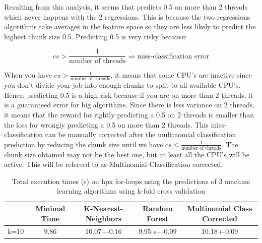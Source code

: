 Resulting from this analysis, it seems that predicts 0.5 on more than 2 threads which never happens with the 2 regressions. This is because the two regressions algorithms take averages in the feature space so they are less likely to predict the highest chunk size 0.5. Predicting 0.5 is very risky because:

$$cs>\frac{1}{\text{number of threads}} \Rightarrow \text{miss-classification error}$$

 When you have $cs>\frac{1}{\text{number of threads}}$, it means that some CPU's are inactive since you don't divide your job into enough chunks to split to all available CPU's. Hence, predicting 0.5 is a high risk because if you are on more than 2 threads, it is a guaranteed error for big algorithms. Since there is less variance on 2 threads, it means that the reward for rightly predicting a  0.5 on 2 threads is smaller than the loss for wrongly predicting a 0.5 on more than 2 threads.
This miss-classification can be manually corrected after the multinomial classification prediction by reducing the chunk size until we have $cs\leq \frac{1}{\text{number of threads}}$. The chunk size obtained may not be the best one, but at least all the CPU's will be active. This will be refereed to as Multinomial Classification corrected.

\begin{table}[h]
	\centering
	\caption{Total execution times (s) on hpx for-loops using the predictions of 3 machine learning algorithms using k-fold cross validation}
	\label{my-label}
	\begin{tabular}{|c|c|c|c|c|}
		\hline
		& Minimal Time &K-Nearest-Neighbors & Random Forest &Multinomial Class Corrected\\ \hline
		k=10 &9.86 & 10.07+-0.16  & 9.95 s+-0.09 & 10.18+-0.09\\ \hline
	\end{tabular}
\end{table}

